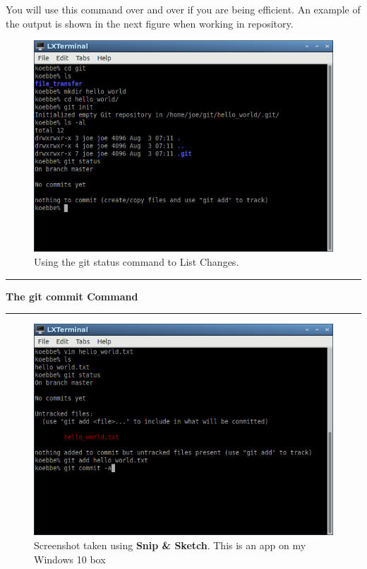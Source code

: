 \documentclass[10pt,fleqn]{article}
\begin{document}
You will use this command over and over if you are being efficient. An example
of the output is shown in the next figure when working in repository.
\vfill
\begin{figure}[h]
\centering
\includegraphics{../images/git_06.png}
\vskip0.1in
\caption{Using the git status command to List Changes.}
\end{figure}
\eject



\vskip0.1in\hrule\vskip0.1in\noindent
{\bf The git commit Command} 
\vskip0.1in\hrule\vskip0.1in\noindent

\vfill
\begin{figure}[h]
\centering
\includegraphics{../images/git_07.png}
\caption{{Screenshot} taken using {\bf Snip \& Sketch}. This is an app on
         my Windows 10 box}
\end{figure}
\eject
\end{document}
